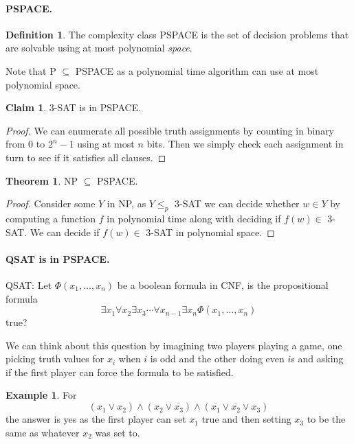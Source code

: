 \documentclass[11pt,a4paper]{article}
\theoremstyle{definition}
\newtheorem{thm}{Theorem}
\newtheorem{claim}{Claim}
\newtheorem{defn}{Definition}
\newtheorem*{ex}{Example}
\begin{document}
\paragraph{PSPACE.}
\begin{defn}
The complexity class PSPACE is the set of decision problems that are solvable using at most polynomial \emph{space}.
\end{defn}

Note that P $\subseteq$ PSPACE as a polynomial time algorithm can use at most polynomial space.

\begin{claim}
3-SAT is in PSPACE.
\end{claim}
\begin{proof}
We can enumerate all possible truth assignments by counting in binary from 0 to $2^{n}-1$ using at most $n$ bits.
Then we simply check each assignment in turn to see if it satisfies all clauses.
\end{proof}

\begin{thm}
NP $\subseteq$ PSPACE.
\end{thm}
\begin{proof}
Consider some $Y$ in NP, as $Y \le_p$ 3-SAT we can decide whether $w \in Y$ by computing a function $f$ in polynomial time along with deciding if $f(w) \in$ 3-SAT.
We can decide if $f(w)\in $ 3-SAT in polynomial space.
\end{proof}

\paragraph{QSAT is in PSPACE.}
QSAT: Let $\Phi(x_1,\ldots,x_n)$ be a boolean formula in CNF, is the propositional formula
\[
\exists x_1 \forall x_2 \exists x_3 \cdots \forall x_{n-1} \exists x_n \Phi(x_1,\ldots,x_n)
\]
true?

We can think about this question by imagining two players playing a game, one picking truth values for $x_i$ when $i$ is odd and the other doing even $i$s and asking if the first player can force the formula to be satisfied.

\begin{ex}
For
\[
(x_1 \vee x_2)\wedge(x_2 \vee\overline{x_3}) \wedge (\overline{x_1} \vee \overline{x_2} \vee x_3)
\]
the answer is yes as the first player can set $x_1$ true and then setting $x_3$ to be the same as whatever $x_2$ was set to.
\end{ex}
\end{document}
